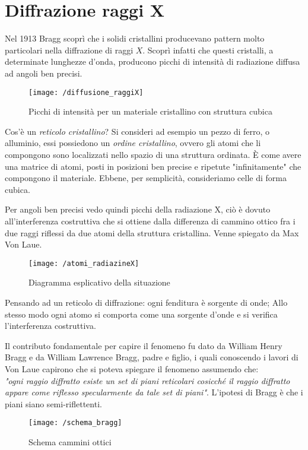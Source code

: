 

\section{Diffrazione raggi X}
Nel 1913 Bragg scoprì che i solidi cristallini producevano pattern molto particolari nella diffrazione di raggi $X$.
Scoprì infatti che questi cristalli, a determinate lunghezze d'onda, producono picchi di intensità di radiazione diffusa ad angoli ben precisi.

\begin{figure}[h]
\centering
\texttt{[image: /diffusione\_raggiX]}
\caption{Picchi di intensità per un materiale cristallino con struttura cubica}
\end{figure}

Cos'è un \textit{reticolo cristallino}? 
Si consideri ad esempio un pezzo di ferro, o alluminio, essi possiedono un \textit{ordine cristallino}, ovvero gli atomi che li compongono sono localizzati nello spazio di una struttura ordinata.
È come avere una matrice di atomi, posti in posizioni ben precise e ripetute "infinitamente" che compongono il materiale.
Ebbene, per semplicità, consideriamo celle di forma cubica.

Per angoli ben precisi vedo quindi picchi della radiazione X, ciò è dovuto all'interferenza costruttiva che si ottiene dalla differenza di cammino ottico fra i due raggi riflessi da due atomi della struttura cristallina.
Venne spiegato da Max Von Laue.
\begin{figure}[h]
\centering
\texttt{[image: /atomi\_radiazineX]}
\caption{Diagramma esplicativo della situazione}
\end{figure}

Pensando ad un reticolo di diffrazione: ogni fenditura è sorgente di onde;
Allo stesso modo ogni atomo si comporta come una sorgente d'onde e si verifica l'interferenza costruttiva.

Il contributo fondamentale per capire il fenomeno fu dato da William Henry Bragg e da William Lawrence Bragg, padre e figlio, i quali conoscendo i lavori di Von Laue capirono che si poteva spiegare il fenomeno assumendo che: \\ 
\textit{"ogni raggio diffratto esiste un set di piani reticolari cosicché il raggio diffratto appare come riflesso specularmente da tale set di piani"}.
L'ipotesi di Bragg è che i piani siano semi-riflettenti.
\begin{figure}[h]
\centering
\texttt{[image: /schema\_bragg]}
\caption{Schema cammini ottici}
\label{cammino_ottico}
\end{figure}

